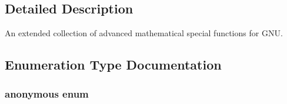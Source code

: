 \subsection{Detailed Description}
An extended collection of advanced mathematical special functions for G\+N\+U. 

\subsection{Enumeration Type Documentation}
\hypertarget{group__gnu__math__spec__func_gad6c62dd86a596716cece6ac2d4cfd4b3}{}\subsubsection[{anonymous enum}]{\setlength{\rightskip}{0pt plus 5cm}anonymous enum}\label{group__gnu__math__spec__func_gad6c62dd86a596716cece6ac2d4cfd4b3}
